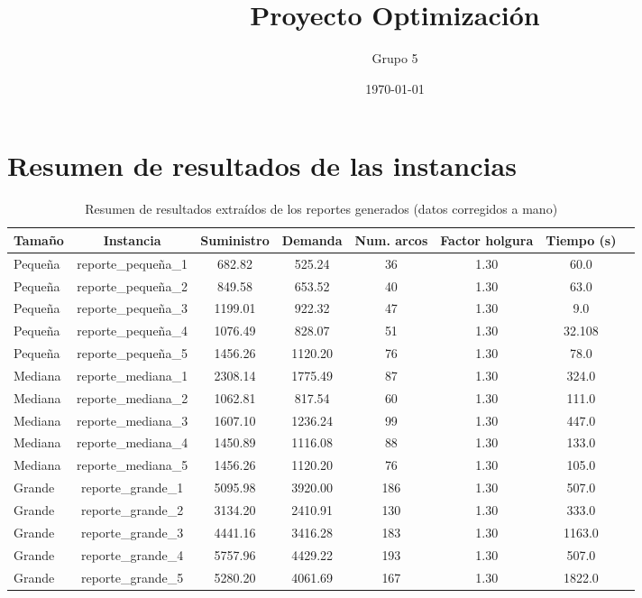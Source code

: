 \documentclass[12pt]{article}
\title{Proyecto Optimización}
\author{Grupo 5}
\date{\today}
\begin{document}
\maketitle



\section{Resumen de resultados de las instancias}

\begin{table}[h]
\centering
\begin{tabular}{@{}lccccccc@{}}
\toprule
Tamaño & Instancia & Suministro & Demanda & Num. arcos & Factor holgura & Tiempo (s) \\
\midrule
Pequeña & reporte\_pequeña\_1 & 682.82 & 525.24 & 36 & 1.30 & 60.0 \\
Pequeña & reporte\_pequeña\_2 & 849.58 & 653.52 & 40 & 1.30 & 63.0 \\
Pequeña & reporte\_pequeña\_3 & 1199.01 & 922.32 & 47 & 1.30 & 9.0 \\
Pequeña & reporte\_pequeña\_4 & 1076.49 & 828.07 & 51 & 1.30 & 32.108 \\
Pequeña & reporte\_pequeña\_5 & 1456.26 & 1120.20 & 76 & 1.30 & 78.0 \\
Mediana & reporte\_mediana\_1 & 2308.14 & 1775.49 & 87 & 1.30 & 324.0 \\
Mediana & reporte\_mediana\_2 & 1062.81 & 817.54 & 60 & 1.30 & 111.0 \\
Mediana & reporte\_mediana\_3 & 1607.10 & 1236.24 & 99 & 1.30 & 447.0 \\
Mediana & reporte\_mediana\_4 & 1450.89 & 1116.08 & 88 & 1.30 & 133.0 \\
Mediana & reporte\_mediana\_5 & 1456.26 & 1120.20 & 76 & 1.30 & 105.0 \\
Grande & reporte\_grande\_1 & 5095.98 & 3920.00 & 186 & 1.30 & 507.0 \\
Grande & reporte\_grande\_2 & 3134.20 & 2410.91 & 130 & 1.30 & 333.0 \\
Grande & reporte\_grande\_3 & 4441.16 & 3416.28 & 183 & 1.30 & 1163.0 \\
Grande & reporte\_grande\_4 & 5757.96 & 4429.22 & 193 & 1.30 & 507.0 \\
Grande & reporte\_grande\_5 & 5280.20 & 4061.69 & 167 & 1.30 & 1822.0 \\
\bottomrule
\end{tabular}
\caption{Resumen de resultados extraídos de los reportes generados (datos corregidos a mano)}
\end{table}

\end{document}
